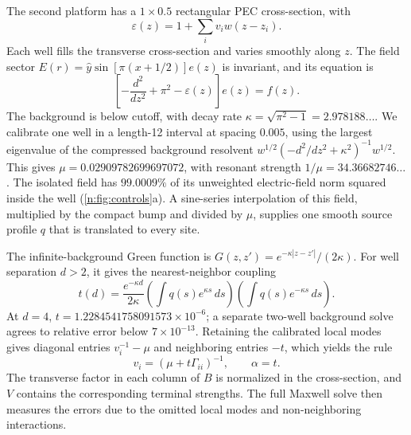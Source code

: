 The second platform has a $1\times0.5$ rectangular PEC cross-section, with
\begin{equation}
 \varepsilon(z)=1+\sum_i v_i w(z-z_i).
 \label{n:eq:waveguide-material}
\end{equation}
Each well fills the transverse cross-section and varies smoothly along $z$.
The field sector
$E(r)=\hat y\sin[\pi(x+1/2)]e(z)$ is invariant, and its equation is
\begin{equation}
 \left[-\frac{d^2}{dz^2}+\pi^2-\varepsilon(z)\right]e(z)=f(z).
 \label{n:eq:channel}
\end{equation}
The background is below cutoff, with decay rate
$\kappa=\sqrt{\pi^2-1}=2.978188\ldots$. We calibrate one well in a
length-12 interval at spacing $0.005$, using the largest eigenvalue of the
compressed background resolvent
$w^{1/2}(-d^2/dz^2+\kappa^2)^{-1}w^{1/2}$. This gives
$\mu=0.02909782699697072$, with resonant strength $1/\mu=34.36682746\ldots$.
The isolated field has $99.0009\%$ of its unweighted electric-field norm
squared inside the well (\cref{n:fig:controls}a). A sine-series interpolation
of this field, multiplied by the compact bump and divided by $\mu$, supplies
one smooth source profile $q$ that is translated to every site.

The infinite-background Green function is
$G(z,z')=e^{-\kappa|z-z'|}/(2\kappa)$. For well separation $d>2$, it gives
the nearest-neighbor coupling
\begin{equation}
 t(d)=\frac{e^{-\kappa d}}{2\kappa}
 \left(\int q(s)e^{\kappa s}\,ds\right)
 \left(\int q(s)e^{-\kappa s}\,ds\right).
 \label{n:eq:pair-coupling}
\end{equation}
At $d=4$, $t=1.2284541758091573\times10^{-6}$; a separate two-well background
solve agrees to relative error below $7\times10^{-13}$. Retaining the
calibrated local modes gives diagonal entries $v_i^{-1}-\mu$ and neighboring
entries $-t$, which yields the rule
\begin{equation}
 v_i=(\mu+t\Gamma_{ii})^{-1},\qquad \alpha=t.
 \label{n:eq:strength}
\end{equation}
The transverse factor in each column of $B$ is normalized in the cross-section,
and $V$ contains the corresponding terminal strengths. The full Maxwell solve
then measures the errors due to the omitted local modes and non-neighboring
interactions.

